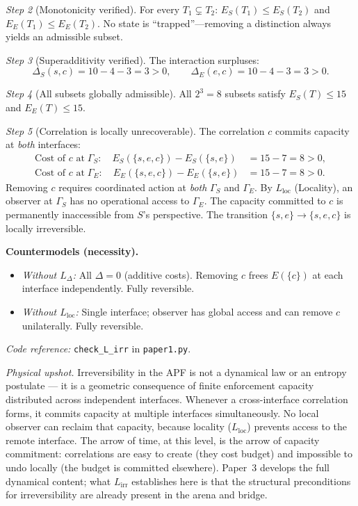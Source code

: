 \documentclass[11pt]{article}
\theoremstyle{remark}
\newenvironment{varlist}{\begin{itemize}[nosep,leftmargin=2em]}{\end{itemize}}
\newcommand{\coderef}[2]{\smallskip\noindent\textit{Code reference:} \texttt{#1} in \texttt{#2}.}
\begin{document}
\begin{tcolorbox}[apfbox, title={Lemma $L_{\mathrm{irr}}$ (Irreversibility)}]
\textit{Step 2} (Monotonicity verified).  For every $T_1 \subsetneq T_2$: $E_S(T_1) \le E_S(T_2)$ and $E_E(T_1) \le E_E(T_2)$.  No state is ``trapped''---removing a distinction always yields an admissible subset.

\textit{Step 3} (Superadditivity verified).  The interaction surpluses:
\begin{equation}
\Delta_S(s,c) = 10 - 4 - 3 = 3 > 0, \qquad \Delta_E(e,c) = 10 - 4 - 3 = 3 > 0.
\end{equation}

\textit{Step 4} (All subsets globally admissible).  All $2^3 = 8$ subsets satisfy $E_S(T) \le 15$ and $E_E(T) \le 15$.

\textit{Step 5} (Correlation is locally unrecoverable).  The correlation $c$ commits capacity at \emph{both} interfaces:
\begin{align}
\text{Cost of $c$ at}\;\Gamma_S:\quad E_S(\{s,e,c\}) - E_S(\{s,e\}) &= 15 - 7 = 8 > 0, \\
\text{Cost of $c$ at}\;\Gamma_E:\quad E_E(\{s,e,c\}) - E_E(\{s,e\}) &= 15 - 7 = 8 > 0.
\end{align}
Removing $c$ requires coordinated action at \emph{both} $\Gamma_S$ and $\Gamma_E$.  By $L_{\mathrm{loc}}$ (Locality), an observer at $\Gamma_S$ has no operational access to $\Gamma_E$.  The capacity committed to $c$ is permanently inaccessible from $S$'s perspective.  The transition $\{s,e\} \to \{s,e,c\}$ is locally irreversible.

\smallskip\noindent\textbf{Countermodels (necessity).}
\begin{varlist}
\item \textit{Without $L_\Delta$:}  All $\Delta = 0$ (additive costs).  Removing $c$ frees $E(\{c\})$ at each interface independently.  Fully reversible.
\item \textit{Without $L_{\mathrm{loc}}$:}  Single interface; observer has global access and can remove $c$ unilaterally.  Fully reversible.
\end{varlist}

\coderef{check\_L\_irr}{paper1.py}
\end{tcolorbox}

\noindent\textit{Physical upshot.}  Irreversibility in the APF is not a dynamical law or an entropy postulate --- it is a geometric consequence of finite enforcement capacity distributed across independent interfaces.  Whenever a cross-interface correlation forms, it commits capacity at multiple interfaces simultaneously.  No local observer can reclaim that capacity, because locality ($L_{\mathrm{loc}}$) prevents access to the remote interface.  The arrow of time, at this level, is the arrow of capacity commitment: correlations are easy to create (they cost budget) and impossible to undo locally (the budget is committed elsewhere).  Paper~3 develops the full dynamical content; what $L_{\mathrm{irr}}$ establishes here is that the structural preconditions for irreversibility are already present in the arena and bridge.
\end{document}
